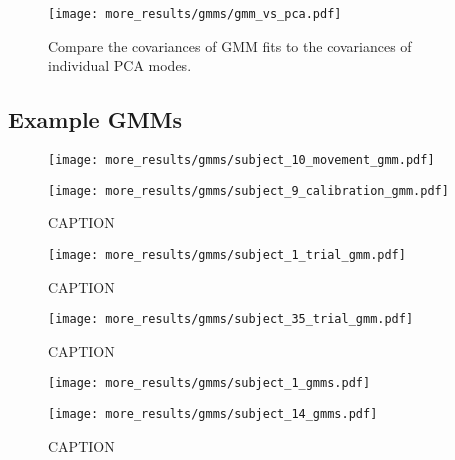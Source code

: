 \documentclass[../main.tex]{subfiles}
\begin{document}
\begin{figure}[H]
  \centering
    \texttt{[image: more\_results/gmms/gmm\_vs\_pca.pdf]}
    \caption[GMMs and PCA Covariance]{Compare the covariances of GMM fits to the covariances of individual PCA modes.}\label{fig:gmm_vs_pca}
\end{figure}


\subsection{Example GMMs}

\begin{figure}[H]
  \centering
  \begin{minipage}{0.49\textwidth}
    \texttt{[image: more\_results/gmms/subject\_10\_movement\_gmm.pdf]}
    \subcaption{}
  \end{minipage}%
  \begin{minipage}{0.49\textwidth}
    \texttt{[image: more\_results/gmms/subject\_9\_calibration\_gmm.pdf]}
    \subcaption{}
  \end{minipage}
  \caption[Example prior GMMs]{CAPTION}\label{fig:example_prior_gmms}
\end{figure}

\begin{figure}[H]
  \centering
    \texttt{[image: more\_results/gmms/subject\_1\_trial\_gmm.pdf]}
    \caption[Subject 1 trial GMMs overlayed on trajectories]{CAPTION}\label{fig:example_1_trial_data_gmms}
\end{figure}

\begin{figure}[H]
  \centering
    \texttt{[image: more\_results/gmms/subject\_35\_trial\_gmm.pdf]}
    \caption[Subject 35 trial GMMs overlayed on trajectories]{CAPTION}\label{fig:example_35_trial_data_gmms}
\end{figure}


\begin{figure}[H]
  \centering
  \begin{minipage}{0.49\textwidth}
    \texttt{[image: more\_results/gmms/subject\_1\_gmms.pdf]}
    \subcaption{}
  \end{minipage}%
  \begin{minipage}{0.49\textwidth}
    \texttt{[image: more\_results/gmms/subject\_14\_gmms.pdf]}
    \subcaption{}
  \end{minipage}
  \caption[Example GMMs for subjects 1 and 14]{CAPTION}\label{fig:example_gmms}
\end{figure}
\end{document}

